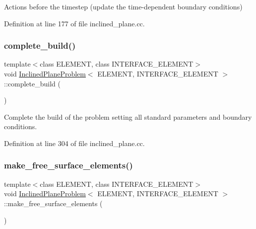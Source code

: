Actions before the timestep (update the time-\/dependent boundary conditions) 



Definition at line 177 of file inclined\+\_\+plane.\+cc.

\mbox{\label{classInclinedPlaneProblem_ae44e360be4a46e1343c3960c3a43380f}} 
\subsubsection{\texorpdfstring{complete\+\_\+build()}{complete\_build()}}
{\footnotesize\ttfamily template$<$class E\+L\+E\+M\+E\+NT, class I\+N\+T\+E\+R\+F\+A\+C\+E\+\_\+\+E\+L\+E\+M\+E\+NT$>$ \\
void \hyperlink{classInclinedPlaneProblem}{Inclined\+Plane\+Problem}$<$ E\+L\+E\+M\+E\+NT, I\+N\+T\+E\+R\+F\+A\+C\+E\+\_\+\+E\+L\+E\+M\+E\+NT $>$\+::complete\+\_\+build (\begin{DoxyParamCaption}{ }\end{DoxyParamCaption})\hspace{0.3cm}{\ttfamily [inline]}}



Complete the build of the problem setting all standard parameters and boundary conditions. 



Definition at line 304 of file inclined\+\_\+plane.\+cc.

\mbox{\label{classInclinedPlaneProblem_a78d06d406af81a3dddbec0a31b65e8a4}} 
\subsubsection{\texorpdfstring{make\+\_\+free\+\_\+surface\+\_\+elements()}{make\_free\_surface\_elements()}}
{\footnotesize\ttfamily template$<$class E\+L\+E\+M\+E\+NT, class I\+N\+T\+E\+R\+F\+A\+C\+E\+\_\+\+E\+L\+E\+M\+E\+NT$>$ \\
void \hyperlink{classInclinedPlaneProblem}{Inclined\+Plane\+Problem}$<$ E\+L\+E\+M\+E\+NT, I\+N\+T\+E\+R\+F\+A\+C\+E\+\_\+\+E\+L\+E\+M\+E\+NT $>$\+::make\+\_\+free\+\_\+surface\+\_\+elements (\begin{DoxyParamCaption}{ }\end{DoxyParamCaption})\hspace{0.3cm}{\ttfamily [inline]}}




